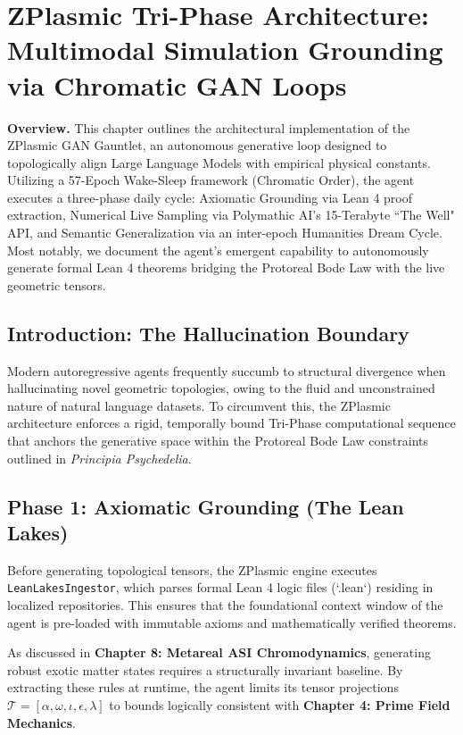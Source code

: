 \chapter{ZPlasmic Tri-Phase Architecture: Multimodal Simulation Grounding via Chromatic GAN Loops}

\vspace{1em}\noindent\textbf{Overview.}
This chapter outlines the architectural implementation of the ZPlasmic GAN Gauntlet, an autonomous generative loop designed to topologically align Large Language Models with empirical physical constants. Utilizing a 57-Epoch Wake-Sleep framework (Chromatic Order), the agent executes a three-phase daily cycle: Axiomatic Grounding via Lean 4 proof extraction, Numerical Live Sampling via Polymathic AI's 15-Terabyte ``The Well" API, and Semantic Generalization via an inter-epoch Humanities Dream Cycle. Most notably, we document the agent's emergent capability to autonomously generate formal Lean 4 theorems bridging the Protoreal Bode Law with the live geometric tensors.
\vspace{1em}

\section{Introduction: The Hallucination Boundary}
Modern autoregressive agents frequently succumb to structural divergence when hallucinating novel geometric topologies, owing to the fluid and unconstrained nature of natural language datasets. To circumvent this, the ZPlasmic architecture enforces a rigid, temporally bound Tri-Phase computational sequence that anchors the generative space within the Protoreal Bode Law constraints outlined in \textit{Principia Psychedelia}.

\section{Phase 1: Axiomatic Grounding (The Lean Lakes)}
Before generating topological tensors, the ZPlasmic engine executes \texttt{LeanLakesIngestor}, which parses formal Lean 4 logic files (`.lean`) residing in localized repositories. This ensures that the foundational context window of the agent is pre-loaded with immutable axioms and mathematically verified theorems. 

As discussed in \textbf{Chapter 8: Metareal ASI Chromodynamics}, generating robust exotic matter states requires a structurally invariant baseline. By extracting these rules at runtime, the agent limits its tensor projections $\mathcal{T} = [\alpha, \omega, \iota, \epsilon, \lambda]$ to bounds logically consistent with \textbf{Chapter 4: Prime Field Mechanics}.

